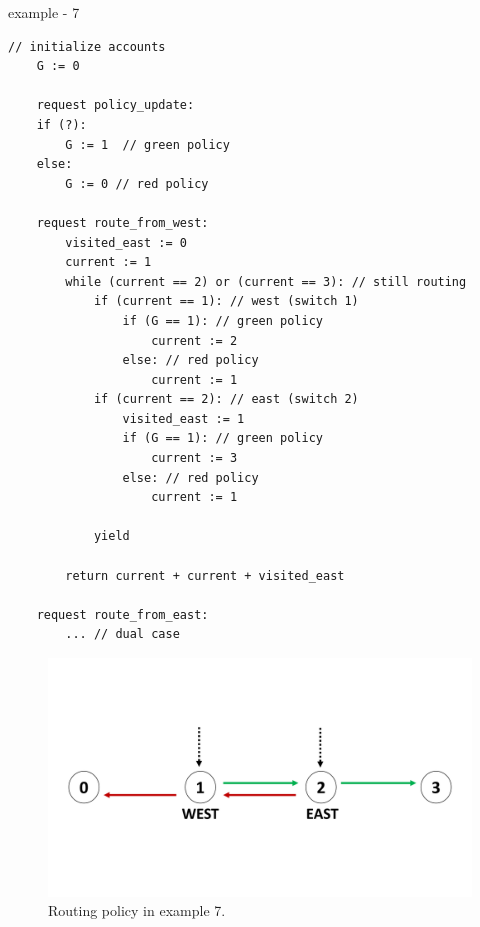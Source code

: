 \newpage

example - 7

\begin{minipage}[t]{1.0\textwidth}
	\begin{lstlisting}[caption={BGP (non serializable --- cycles can appear)}]
    // initialize accounts
    G := 0
    
    request policy_update:
    if (?):
        G := 1  // green policy 
    else:
        G := 0 // red policy
		
    request route_from_west:
        visited_east := 0
        current := 1
        while (current == 2) or (current == 3): // still routing        
            if (current == 1): // west (switch 1)
                if (G == 1): // green policy
                    current := 2
                else: // red policy
                    current := 1
            if (current == 2): // east (switch 2)
                visited_east := 1
                if (G == 1): // green policy
                    current := 3
                else: // red policy
                    current := 1
 
            yield
		
        return current + current + visited_east
        
    request route_from_east:
        ... // dual case     		        
	\end{lstlisting}
\end{minipage}



\begin{figure}[h]
	\centering
	\includegraphics[width=0.65\linewidth]{plots/BgpColoredRouting.pdf}
	\caption{Routing policy in example 7.}
	\label{fig:pdfimage}
\end{figure}

\newpage